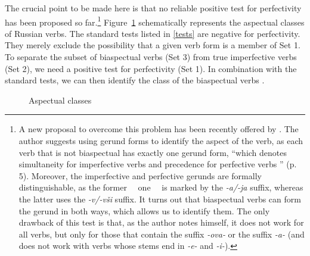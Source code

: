 The crucial point to be made here is that no reliable positive test for perfectivity  has been proposed so far.\footnote{A new proposal to overcome this problem has been recently offered by \citet{Piperski:biasp}. The author suggests using gerund forms to identify the aspect of the verb, as each verb that is not biaspectual has exactly one gerund form, ``which denotes simultaneity for imperfective verbs  and precedence for perfective verbs '' (p. 5). Moreover, the imperfective  and perfective gerunds are formally distinguishable, as the former ~~one~~ is marked by the \textit{-a/-ja} suffix, whereas the latter uses the \textit{-v/-v\v{s}i} suffix. It turns out that biaspectual verbs  can form the gerund in both ways, which allows us to identify them. The only drawback of this test is that, as the author notes himself, it does not work for all verbs, but only for those that contain the suffix \textit{-ova-}   or the suffix \textit{-a-} (and does not work with verbs whose stems end in \textit{-e-} and \textit{-i-}).} Figure~\ref{circles} schematically represents the aspectual classes of Russian verbs. The standard tests listed in \ref{tests} are negative for perfectivity. They merely exclude the possibility that a given verb form is a member of Set 1. To separate the subset of biaspectual verbs  (Set 3) from true imperfective verbs  (Set 2), we need a positive test for perfectivity  (Set 1). In combination with the standard tests, we can then identify the class of the biaspectual verbs .\largerpage

\begin{figure}
\caption{\label{circles}Aspectual classes}
\end{figure}

